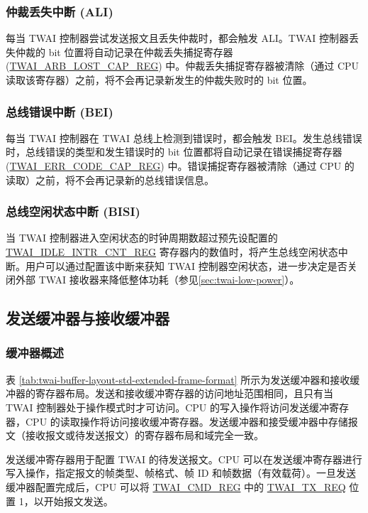 \documentclass[main\_\_CN.tex]{subfiles}
\begin{document}
\subsubsection{仲裁丢失中断 (ALI)}
\label{other:twai-para-ali}
每当 TWAI 控制器尝试发送报文且丢失仲裁时，都会触发 ALI。TWAI 控制器丢失仲裁的 bit 位置将自动记录在仲裁丢失捕捉寄存器 (\hyperref[regdesc:TWAIARBLOSTCAPREG]{TWAI\_ARB\_LOST\_CAP\_REG}) 中。仲裁丢失捕捉寄存器被清除（通过 CPU 读取该寄存器）之前，将不会再记录新发生的仲裁失败时的 bit 位置。

\subsubsection{总线错误中断 (BEI)}
\label{other:twai-para-bei}
每当 TWAI 控制器在 TWAI 总线上检测到错误时，都会触发 BEI。发生总线错误时，总线错误的类型和发生错误时的 bit 位置都将自动记录在错误捕捉寄存器 (\hyperref[regdesc:TWAIERRCODECAPREG]{TWAI\_ERR\_CODE\_CAP\_REG}) 中。错误捕捉寄存器被清除（通过 CPU 的读取）之前，将不会再记录新的总线错误信息。

\subsubsection{总线空闲状态中断 (BISI)}
\label{other:twai-para-bisi}
当 TWAI 控制器进入空闲状态的时钟周期数超过预先设配置的 \hyperref[regdesc:TWAIIDLEINTRCNTREG]{TWAI\_IDLE\_INTR\_CNT\_REG} 寄存器内的数值时，将产生总线空闲状态中断。用户可以通过配置该中断来获知 TWAI 控制器空闲状态，进一步决定是否关闭外部 TWAI 接收器来降低整体功耗（参见\ref{sec:twai-low-power}）。

\subsection{发送缓冲器与接收缓冲器}
\subsubsection{缓冲器概述}



表 \ref{tab:twai-buffer-layout-std-extended-frame-format} 所示为发送缓冲器和接收缓冲器的寄存器布局。发送和接收缓冲寄存器的访问地址范围相同，且只有当 TWAI 控制器处于操作模式时才可访问。CPU 的写入操作将访问发送缓冲寄存器，CPU 的读取操作将访问接收缓冲寄存器。发送缓冲器和接受缓冲器中存储报文（接收报文或待发送报文）的寄存器布局和域完全一致。

发送缓冲寄存器用于配置 TWAI 的待发送报文。CPU 可以在发送缓冲寄存器进行写入操作，指定报文的帧类型、帧格式、帧 ID 和帧数据（有效载荷）。一旦发送缓冲器配置完成后，CPU 可以将 \hyperref[regdesc:TWAICMDREG]{TWAI\_CMD\_REG} 中的 \hyperref[fielddesc:TWAITXREQ]{TWAI\_TX\_REQ} 位置 1，以开始报文发送。
\end{document}
